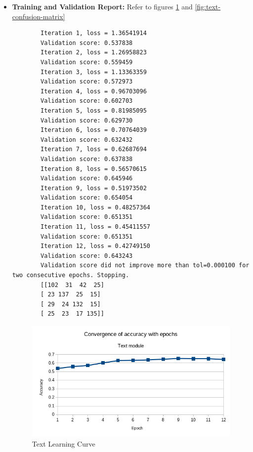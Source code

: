 \documentclass[oneside,a4paper,12pt]{report}
\begin{document}
\begin{normalsize}
\begin{itemize}
\begin{itemize}
		\item \textbf{Training and Validation Report:}
		Refer to figures \ref{fig:text-convergence} and \ref{fig:text-confusion-matrix}
		\begin{verbatim}
		Iteration 1, loss = 1.36541914
		Validation score: 0.537838
		Iteration 2, loss = 1.26958823
		Validation score: 0.559459
		Iteration 3, loss = 1.13363359
		Validation score: 0.572973
		Iteration 4, loss = 0.96703096
		Validation score: 0.602703
		Iteration 5, loss = 0.81985095
		Validation score: 0.629730
		Iteration 6, loss = 0.70764039
		Validation score: 0.632432
		Iteration 7, loss = 0.62687694
		Validation score: 0.637838
		Iteration 8, loss = 0.56570615
		Validation score: 0.645946
		Iteration 9, loss = 0.51973502
		Validation score: 0.654054
		Iteration 10, loss = 0.48257364
		Validation score: 0.651351
		Iteration 11, loss = 0.45411557
		Validation score: 0.651351
		Iteration 12, loss = 0.42749150
		Validation score: 0.643243
		Validation score did not improve more than tol=0.000100 for two consecutive epochs. Stopping.
		[[102  31  42  25]
		[ 23 137  25  15]
		[ 29  24 132  15]
		[ 25  23  17 135]]
	\end{verbatim}
		\begin{center}
			\begin{figure}[!htbp]
				\centering
				\includegraphics[width=\textwidth]{text-convergence.png}
				\caption{Text Learning Curve}
				\label{fig:text-convergence}
			\end{figure}
		\end{center} 
		

\end{itemize}
\end{itemize}
\end{normalsize}
\end{document}
